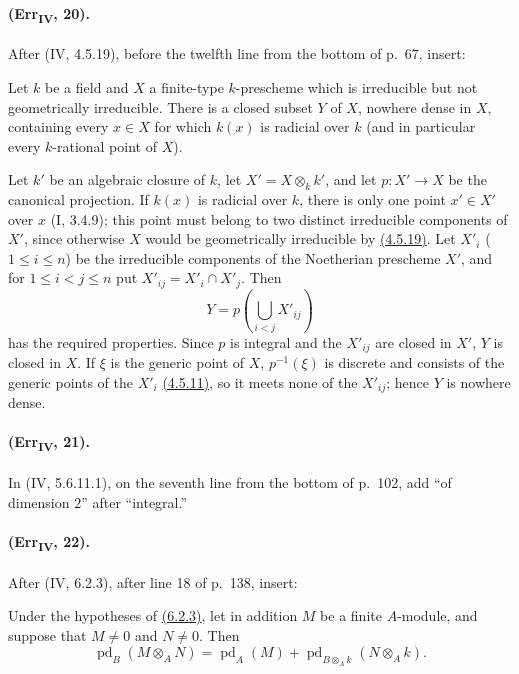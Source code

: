 \paragraph{(Err\textsubscript{IV}, 20).}
After (IV, 4.5.19), before the twelfth line from the bottom of p.~67,
insert:

\begin{corollary}[4.5.19.3]
\label{IV.4.5.19.3}
Let $k$ be a field and $X$ a finite-type $k$-prescheme which is
irreducible but not geometrically irreducible.  There is a closed subset
$Y$ of $X$, nowhere dense in $X$, containing every $x\in X$ for which
$k(x)$ is radicial over $k$ (and in particular every $k$-rational point
of $X$).
\end{corollary}

Let $k'$ be an algebraic closure of $k$, let $X'=X\otimes_kk'$, and let
$p:X'\to X$ be the canonical projection.  If $k(x)$ is radicial over
$k$, there is only one point $x'\in X'$ over $x$ (I, 3.4.9); this point
must belong to two distinct irreducible components of $X'$, since
otherwise $X$ would be geometrically irreducible by {\hyperref[IV.4.5.19]{(4.5.19)}}.  Let
$X'_i$ ($1\leq i\leq n$) be the irreducible components of the Noetherian
prescheme $X'$, and for $1\leq i<j\leq n$ put
$X'_{ij}=X'_i\cap X'_j$.  Then
\[
 Y=p\left(\bigcup_{i<j}X'_{ij}\right)
\]
has the required properties.  Since $p$ is integral and the $X'_{ij}$
are closed in $X'$, $Y$ is closed in $X$.  If $\xi$ is the generic point
of $X$, $p^{-1}(\xi)$ is discrete and consists of the generic points of
the $X'_i$ {\hyperref[IV.4.5.11]{(4.5.11)}}, so it meets none of the $X'_{ij}$; hence $Y$ is
nowhere dense.

\paragraph{(Err\textsubscript{IV}, 21).}
In (IV, 5.6.11.1), on the seventh line from the bottom of p.~102, add
``of dimension $2$'' after ``integral.''

\paragraph{(Err\textsubscript{IV}, 22).}
After (IV, 6.2.3), after line 18 of p.~138, insert:

\begin{proposition}[6.2.4]
\label{IV.6.2.4}
Under the hypotheses of {\hyperref[IV.6.2.3]{(6.2.3)}}, let in addition $M$ be a finite
$A$-module, and suppose that $M\neq0$ and $N\neq0$.  Then
\begin{equation}
 \operatorname{pd}_B(M\otimes_AN)=
 \operatorname{pd}_A(M)+
 \operatorname{pd}_{B\otimes_Ak}(N\otimes_Ak). \label{IV.6.2.4.1}
\tag{6.2.4.1}
\end{equation}
\end{proposition}

